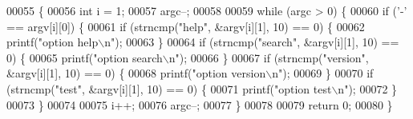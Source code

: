 \begin{DoxyCode}
00055                                  \{
00056   \textcolor{keywordtype}{int} i = 1;
00057   argc--;
00058 
00059   \textcolor{keywordflow}{while} (argc > 0) \{
00060     \textcolor{keywordflow}{if} (\textcolor{charliteral}{'-'} == argv[i][0]) \{
00061       \textcolor{keywordflow}{if} (strncmp(\textcolor{stringliteral}{"help"}, &argv[i][1], 10) == 0) \{
00062         printf(\textcolor{stringliteral}{"option help\(\backslash\)n"});
00063       \}
00064       \textcolor{keywordflow}{if} (strncmp(\textcolor{stringliteral}{"search"}, &argv[i][1], 10) == 0) \{
00065         printf(\textcolor{stringliteral}{"option search\(\backslash\)n"});
00066       \}
00067       \textcolor{keywordflow}{if} (strncmp(\textcolor{stringliteral}{"version"}, &argv[i][1], 10) == 0) \{
00068         printf(\textcolor{stringliteral}{"option version\(\backslash\)n"});
00069       \}
00070       \textcolor{keywordflow}{if} (strncmp(\textcolor{stringliteral}{"test"}, &argv[i][1], 10) == 0) \{
00071         printf(\textcolor{stringliteral}{"option test\(\backslash\)n"});
00072       \}
00073     \}
00074 
00075     i++;
00076     argc--;
00077   \}
00078 
00079   \textcolor{keywordflow}{return} 0;
00080 \}
\end{DoxyCode}
